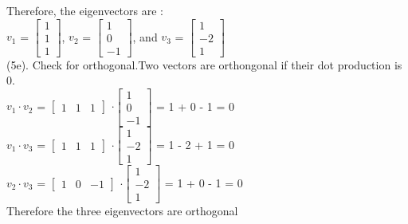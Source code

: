 \documentclass[12pt,a4paper]{article}
\begin{document}
 Therefore, the eigenvectors are :\vspace{5mm}\\
 $v_1$ = $\begin{bmatrix}
 1\\1\\1
 \end{bmatrix}$, $v_2$ = $\begin{bmatrix}
 1\\0\\-1
 \end{bmatrix}$, and $v_3$ = $\begin{bmatrix}
 1\\-2\\1
 \end{bmatrix}$\vspace{5mm}\\
 (5e). Check for orthogonal.Two vectors are orthongonal if their dot production is 0.\vspace{5mm}\\
  $v_1 \cdotp v_2$ = $\begin{bmatrix}
  1&1&1
  \end{bmatrix}$ $\cdotp$$\begin{bmatrix}
  1\\0\\-1
  \end{bmatrix}$ = 1 + 0 - 1 = 0 \vspace{5mm}\\
  
  $v_1 \cdotp v_3$ = $\begin{bmatrix}
  1&1&1
  \end{bmatrix}$ $\cdotp$$\begin{bmatrix}
  1\\-2\\1
  \end{bmatrix}$ = 1 - 2 + 1 = 0 \vspace{5mm}\\
  
  $v_2 \cdotp v_3$ = $\begin{bmatrix}
  1&0&-1
  \end{bmatrix}$ $\cdotp$$\begin{bmatrix}
  1\\-2\\1
  \end{bmatrix}$ = 1 + 0 - 1 = 0 \vspace{5mm}\\
  Therefore the three eigenvectors are orthogonal
  
\end{document}
